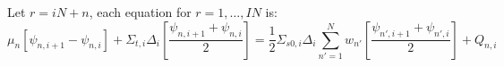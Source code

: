 \documentclass[]{SRJcommon}
\begin{document}
Let $r = iN + n$, each equation for $r = 1, \ldots, IN$ is:
$$
\mu_n \left[ \psi_{n,i+1} - \psi_{n,i} \right]
+ \Sigma_{t,i} \Delta_i \left[ \frac{\psi_{n,i+1} + \psi_{n,i}}{2} \right]
=
\frac{1}{2} \Sigma_{s0,i} \Delta_i 
\sum_{n'=1}^{N} w_{n'} \left[ \frac{\psi_{n',i+1} + \psi_{n',i}}{2} \right]
  + Q_{n,i}
$$

\nocite{Lew1984,Lar2007}


\end{document}
